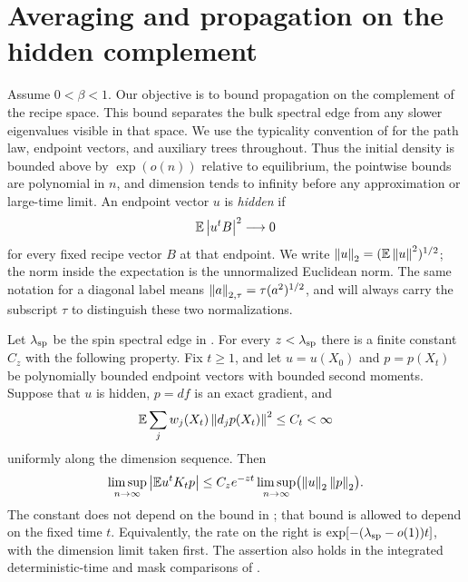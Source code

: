 \section{Averaging and propagation on the hidden complement}
\label{sec:hidden}

Assume $0<\beta<1$. Our objective is to bound propagation on the
complement of the recipe space. This bound separates the bulk spectral
edge from any slower eigenvalues visible in that space.
We use the typicality convention of  for the
path law, endpoint vectors, and auxiliary trees throughout. Thus the
initial density is bounded above by $\exp(o(n))$ relative to equilibrium,
the pointwise bounds are polynomial in $n$, and dimension tends to
infinity before any approximation or large-time limit.
An endpoint vector $u$ is \emph{hidden} if
\[
 \mathbb E\left\lvert u^t B\right\rvert^2\longrightarrow0
\]
for every fixed recipe vector $B$ at that endpoint. We write
$\left\lVert u\right\rVert_2=(\mathbb E\left\lVert u\right\rVert^2)^{1/2}$; the norm inside the expectation is
the unnormalized Euclidean norm. The same notation for a diagonal label
means $\left\lVert a\right\rVert_{2,\tau}=\tau(a^2)^{1/2}$, and will always carry the
subscript $\tau$ to distinguish these two normalizations.

\begin{theorem}\label{thm:hidden-propagation}
Let $\lambda_{\rm sp}$ be the spin spectral edge in
. For every $z<\lambda_{\rm sp}$ there is a
finite constant $C_z$ with the following property. Fix $t\geq1$, and let
$u=u(X_0)$ and $p=p(X_t)$ be polynomially bounded endpoint vectors with
bounded second moments. Suppose that $u$ is hidden, $p=df$ is an exact
gradient, and
\begin{equation}\label{eq:hidden-energy-hypothesis}
 \mathbb E\sum_j w_j(X_t)\left\lVert d_jp(X_t)\right\rVert^2\leq C_t<\infty
\end{equation}
uniformly along the dimension sequence. Then
\begin{equation}\label{eq:hidden-propagation}
 \limsup_{n\to\infty}\left\lvert \mathbb E u^tK_t p\right\rvert
 \leq C_z e^{-zt}
       \limsup_{n\to\infty}\bigl(\left\lVert u\right\rVert_2\left\lVert p\right\rVert_2\bigr).
\end{equation}
The constant does not depend on the bound in
; that bound is allowed to depend on
the fixed time $t$. Equivalently, the rate on the right is
$\exp[-(\lambda_{\rm sp}-o(1))t]$, with the dimension limit taken first.
The assertion also holds in the integrated deterministic-time and mask
comparisons of .
\end{theorem}

